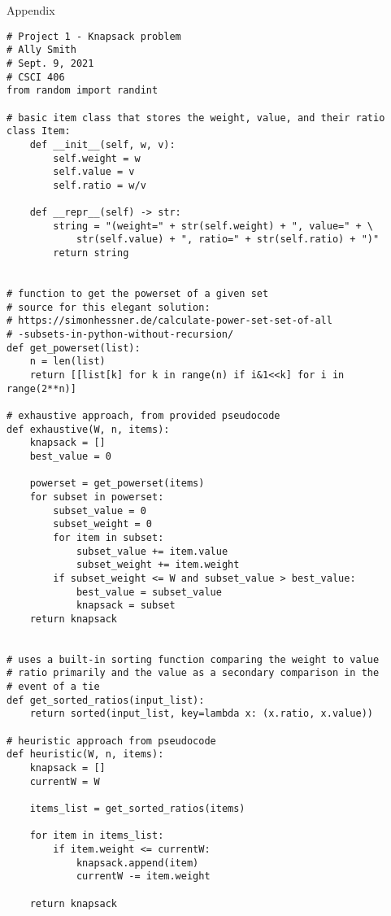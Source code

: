 \documentclass[12pt]{article}
\begin{document}
{\bf
\begin{center}
    Appendix
\end{center}
}
\begin{verbatim}
# Project 1 - Knapsack problem
# Ally Smith
# Sept. 9, 2021
# CSCI 406
from random import randint

# basic item class that stores the weight, value, and their ratio
class Item:
    def __init__(self, w, v):
        self.weight = w
        self.value = v
        self.ratio = w/v

    def __repr__(self) -> str:
        string = "(weight=" + str(self.weight) + ", value=" + \
            str(self.value) + ", ratio=" + str(self.ratio) + ")"
        return string


# function to get the powerset of a given set 
# source for this elegant solution:
# https://simonhessner.de/calculate-power-set-set-of-all
# -subsets-in-python-without-recursion/
def get_powerset(list):
    n = len(list)
    return [[list[k] for k in range(n) if i&1<<k] for i in range(2**n)]

# exhaustive approach, from provided pseudocode
def exhaustive(W, n, items):
    knapsack = []
    best_value = 0
    
    powerset = get_powerset(items)
    for subset in powerset:
        subset_value = 0
        subset_weight = 0
        for item in subset:
            subset_value += item.value
            subset_weight += item.weight
        if subset_weight <= W and subset_value > best_value:
            best_value = subset_value
            knapsack = subset
    return knapsack


# uses a built-in sorting function comparing the weight to value
# ratio primarily and the value as a secondary comparison in the
# event of a tie
def get_sorted_ratios(input_list):
    return sorted(input_list, key=lambda x: (x.ratio, x.value))

# heuristic approach from pseudocode
def heuristic(W, n, items):
    knapsack = []
    currentW = W

    items_list = get_sorted_ratios(items)

    for item in items_list:
        if item.weight <= currentW:
            knapsack.append(item)
            currentW -= item.weight

    return knapsack
\end{verbatim}
\end{document}
